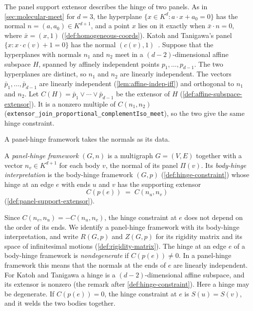 The panel support extensor describes the hinge of two panels. As in
\cref{sec:molecular-meet} for $d = 3$, the hyperplane
$\{x \in K^d : a \cdot x + a_0 = 0\}$ has the normal
$n = (a, a_0) \in K^{d+1}$, and a point $x$ lies on it exactly when
$\bar x \cdot n = 0$, where $\bar x = (x, 1)$
(\cref{def:homogeneous-coords}). Katoh and Tanigawa's panel
$\{x : x \cdot c(v) + 1 = 0\}$ has the normal
$(c(v), 1)$~\cite[\S5.1]{katohTanigawa2011}. Suppose that the hyperplanes
with normals $n_1$ and $n_2$ meet in a $(d-2)$-dimensional affine
subspace $H$, spanned by affinely independent points
$p_1, \dots, p_{d-1}$. The two hyperplanes are distinct, so $n_1$ and
$n_2$ are linearly independent. The vectors
$\bar p_1, \dots, \bar p_{d-1}$ are linearly independent
(\cref{lem:affine-indep-iff}) and orthogonal to $n_1$ and $n_2$. Let
$C(H) = \bar p_1 \vee \cdots \vee \bar p_{d-1}$ be the extensor of $H$
(\cref{def:affine-subspace-extensor}). It is a nonzero multiple of
$C(n_1, n_2)$
(\texttt{extensor\_\allowbreak{}join\_\allowbreak{}proportional\_\allowbreak{}complementIso\_\allowbreak{}meet}),
so the two give the same hinge constraint.

A panel-hinge framework takes the normals as its data.

\begin{definition}
  \label{def:panel-hinge-framework}
  \leanok
  A \emph{panel-hinge framework} $(G, n)$ is a multigraph $G = (V, E)$
  together with a vector $n_v \in K^{d+1}$ for each body $v$, the normal
  of its panel $\Pi(v)$. Its \emph{body-hinge interpretation} is the
  body-hinge framework $(G, p)$ (\cref{def:hinge-constraint}) whose hinge
  at an edge $e$ with ends $u$ and $v$ has the supporting extensor
  \[
    C(p(e)) \;=\; C(n_u, n_v)
  \]
  (\cref{def:panel-support-extensor}).
\end{definition}

Since $C(n_v, n_u) = -C(n_u, n_v)$, the hinge constraint at $e$ does not
depend on the order of its ends. We identify a panel-hinge framework
with its body-hinge interpretation, and write $R(G,p)$ and $Z(G,p)$ for
its rigidity matrix and its space of infinitesimal motions
(\cref{def:rigidity-matrix}). The hinge at an edge $e$ of a body-hinge
framework is \emph{nondegenerate} if $C(p(e)) \neq 0$. In a panel-hinge
framework this means that the normals at the ends of $e$ are linearly
independent. For Katoh and Tanigawa a hinge is a $(d-2)$-dimensional
affine subspace, and its extensor is nonzero (the remark after
\cref{def:hinge-constraint}). Here a hinge may be degenerate. If
$C(p(e)) = 0$, the hinge constraint at $e$ is $S(u) = S(v)$, and it welds
the two bodies together.

